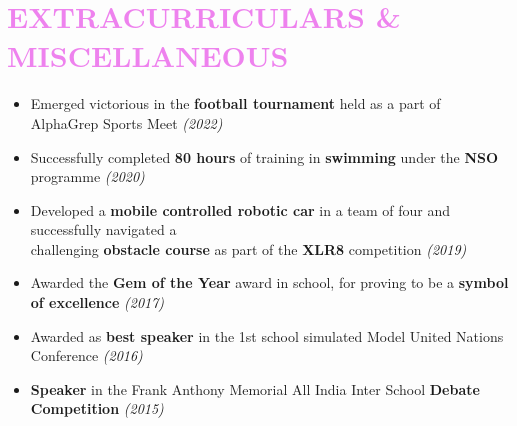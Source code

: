 \documentclass[a4paper,11pt]{article}
\begin{document}
\section{\textcolor{Violet}{\textbf{\Large{E}\large{XTRACURRICULARS} \large{\&} \Large{M}\large{ISCELLANEOUS}}}}
 \vspace{-5pt}
\begin{itemize}[noitemsep]
    \item Emerged victorious in the \textbf{football tournament} held as a part of AlphaGrep Sports Meet \hfill \emph{(2022)}
	\item Successfully completed \textbf{80 hours} of training in \textbf{swimming} under the \textbf{NSO} programme \hfill \emph{(2020)}
    \item Developed a \textbf{mobile controlled robotic car} in a team of four and successfully navigated a \\challenging \textbf{obstacle course} as part of the \textbf{XLR8} competition \hfill \emph{(2019)}
    \item Awarded the \textbf{Gem of the Year} award in school, for proving to be a \textbf{symbol of excellence} \hfill \emph{(2017)}
    \item Awarded as \textbf{best speaker} in the 1st school simulated Model United Nations Conference \hfill \emph{(2016)}
    \item \textbf{Speaker} in the Frank Anthony Memorial All India Inter School \textbf{Debate Competition} \hfill \emph{(2015)}
\end{itemize}
\vspace{-6mm}
\end{document}
